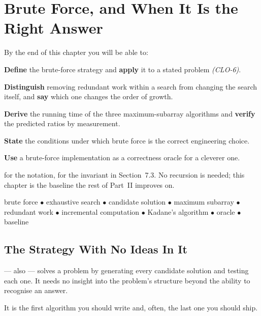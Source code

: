 \chapter{Brute Force, and When It Is the Right Answer}\label{ch:bruteforce}

\begin{outcomes}
By the end of this chapter you will be able to:
\begin{tight}
  \item \textbf{Define} the brute-force strategy and \textbf{apply} it to a
        stated problem \emph{(CLO-6)}.
  \item \textbf{Distinguish} removing redundant work within a search from
        changing the search itself, and \textbf{say} which one changes the
        order of growth.
  \item \textbf{Derive} the running time of the three maximum-subarray
        algorithms and \textbf{verify} the predicted ratios by measurement.
  \item \textbf{State} the conditions under which brute force is the correct
        engineering choice.
  \item \textbf{Use} a brute-force implementation as a correctness oracle for a
        cleverer one.
\end{tight}
\end{outcomes}

\begin{prereq}
 for the notation,  for the invariant in
Section~7.3. No recursion is needed; this chapter is the baseline the rest of
Part~II improves on.
\end{prereq}

\begin{keyterms}
brute force $\bullet$ exhaustive search $\bullet$ candidate solution $\bullet$
maximum subarray $\bullet$ redundant work $\bullet$ incremental computation
$\bullet$ Kadane's algorithm $\bullet$ oracle $\bullet$ baseline
\end{keyterms}

\section{The Strategy With No Ideas In It}

\begin{definitionbox}
 --- also  --- solves a problem by
generating every candidate solution and testing each one. It needs no insight
into the problem's structure beyond the ability to recognise an answer.

\smallskip
It is the first algorithm you should write and, often, the last one you should
ship.
\end{definitionbox}

